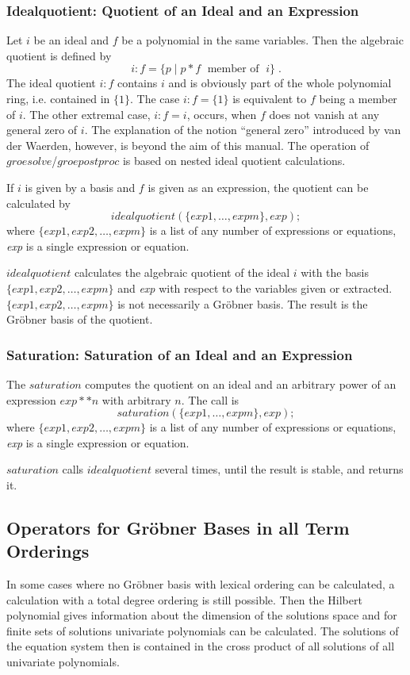 \subsubsection{Idealquotient: Quotient of an Ideal and an Expression}
 
Let $i$ be an ideal and $f$ be a polynomial in the same
variables. Then the algebraic quotient is defined by
\[
i:f = \{ p \;| \; p * f \;\mbox{    member of }\; i\}\;.
\]
The ideal quotient $i:f$ contains $i$ and is obviously part of the
whole polynomial ring, i.e. contained in $\{1\}$. The case $i:f =
\{1\}$ is equivalent to $f$ being a member of  $i$. The other extremal
case, $i:f=i$, occurs, when $f$ does not vanish at any general zero of $i$.
The explanation of the notion ``general zero'' introduced by van der
Waerden, however, is beyond the aim of this manual. The operation
of $groesolve$/$groepostproc$ is based on nested ideal quotient
calculations.

If $i$ is given by a basis and $f$ is given as an expression, the
quotient can be calculated by
\[
idealquotient (\{exp1, \ldots , expm\}, exp); \]
where $\{exp1, exp2, \ldots , expm\}$ is a list of any number of
expressions or equations, {\it exp} is a single expression or equation.

$idealquotient$ calculates the algebraic quotient of the ideal $i$
with the basis  $\{exp1, exp2, \ldots , expm\}$ and {\it exp} with
respect to  the variables given or extracted.  $\{exp1, exp2, \ldots ,
expm\}$ is not necessarily a Gr\"obner basis.
The result is the Gr\"obner basis of the quotient.

\subsubsection{Saturation: Saturation of an Ideal and an Expression}
The $saturation$ computes the quotient on an ideal and an arbitrary power
of an expression $exp**n$ with arbitrary $n$. The call is
\[ saturation (\{exp1, \ldots , expm\}, exp); \]
where $\{exp1, exp2, \ldots , expm\}$ is a list of any number of
expressions or equations, {\it exp} is a single expression or equation.

$saturation$ calls $idealquotient$ several times, until the result is
stable, and returns it.

\subsection{Operators for Gr\"obner Bases in all Term Orderings}
In some cases where no Gr\"obner
basis with lexical ordering can be calculated, a calculation with a total
degree ordering is still possible. Then the Hilbert polynomial gives
information about the dimension of the solutions space and for finite
sets of solutions univariate polynomials can be calculated. The solutions
of the equation system then is contained in the cross product of all
solutions of all univariate polynomials.


